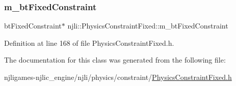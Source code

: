 \subsubsection{\texorpdfstring{m\+\_\+bt\+Fixed\+Constraint}{m\_btFixedConstraint}}
{\footnotesize\ttfamily bt\+Fixed\+Constraint$\ast$ njli\+::\+Physics\+Constraint\+Fixed\+::m\+\_\+bt\+Fixed\+Constraint\hspace{0.3cm}{\ttfamily [private]}}



Definition at line 168 of file Physics\+Constraint\+Fixed.\+h.



The documentation for this class was generated from the following file\+:\begin{DoxyCompactItemize}
\item 
njligames-\/njlic\+\_\+engine/njli/physics/constraint/\mbox{\hyperlink{_physics_constraint_fixed_8h}{Physics\+Constraint\+Fixed.\+h}}\end{DoxyCompactItemize}
